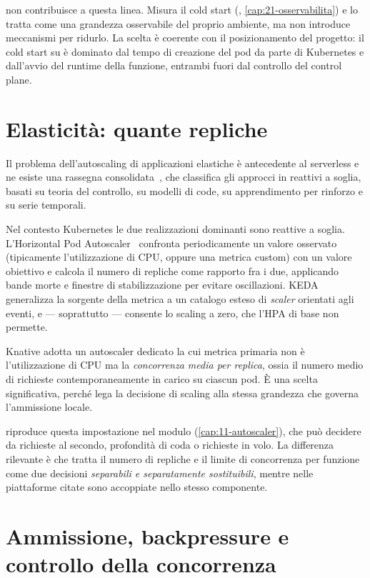 \nf{} non contribuisce a questa linea. Misura il cold start
(, \cref{cap:21-osservabilita}) e lo tratta come
una grandezza osservabile del proprio ambiente, ma non introduce meccanismi per
ridurlo. La scelta \`e coerente con il posizionamento del progetto: il cold
start su \nf{} \`e dominato dal tempo di creazione del pod da parte di
Kubernetes e dall'avvio del runtime della funzione, entrambi fuori dal
controllo del control plane.

\section{Elasticit\`a: quante repliche}

Il problema dell'autoscaling di applicazioni elastiche \`e antecedente al
serverless e ne esiste una rassegna
consolidata~\cite{loridobotran2014autoscaling}, che classifica gli approcci in
reattivi a soglia, basati su teoria del controllo, su modelli di code, su
apprendimento per rinforzo e su serie temporali.

Nel contesto Kubernetes le due realizzazioni dominanti sono reattive a soglia.
L'Horizontal Pod Autoscaler~\cite{k8shpa} confronta periodicamente un valore
osservato (tipicamente l'utilizzazione di CPU, oppure una metrica custom) con
un valore obiettivo e calcola il numero di repliche come rapporto fra i due,
applicando bande morte e finestre di stabilizzazione per evitare oscillazioni.
KEDA~\cite{keda} generalizza la sorgente della metrica a un catalogo esteso di
\emph{scaler} orientati agli eventi, e --- soprattutto --- consente lo scaling
a zero, che l'HPA di base non permette.

Knative adotta un autoscaler dedicato la cui metrica primaria non \`e
l'utilizzazione di CPU ma la \emph{concorrenza media per replica}, ossia il
numero medio di richieste contemporaneamente in carico su ciascun pod. \`E una
scelta significativa, perch\'e lega la decisione di scaling alla stessa
grandezza che governa l'ammissione locale.

\nf{} riproduce questa impostazione nel modulo 
(\cref{cap:11-autoscaler}), che pu\`o decidere da richieste al secondo,
profondit\`a di coda o richieste in volo. La differenza rilevante \`e che \nf{}
tratta il numero di repliche e il limite di concorrenza per funzione come due
decisioni \emph{separabili e separatamente sostituibili}, mentre nelle
piattaforme citate sono accoppiate nello stesso componente.

\section{Ammissione, backpressure e controllo della concorrenza}

